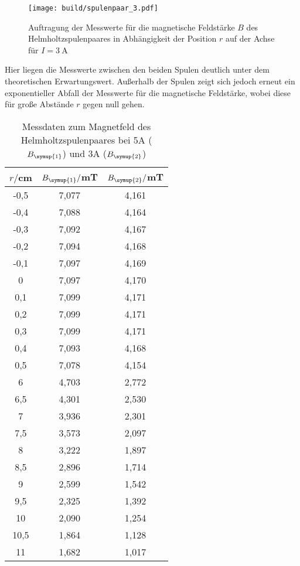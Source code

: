 \begin{figure}
  \centering
  \texttt{[image: build/spulenpaar\_3.pdf]}
  \caption{Auftragung der Messwerte für die magnetische Feldstärke $B$ des Helmholtzspulenpaares
  in Abhängigkeit der Position $r$ auf der Achse für $I=\SI{3}{\ampere}$}
  \label{fig:spulenpaar_3}
\end{figure}

Hier liegen die Messwerte zwischen den beiden Spulen deutlich unter dem
theoretischen Erwartungswert. Außerhalb der Spulen zeigt sich jedoch erneut ein
exponentieller Abfall der Messwerte für die magnetische Feldstärke, wobei diese für
große Abstände $r$ gegen null gehen.


\begin{table}
  \centering
  \caption{Messdaten zum Magnetfeld des Helmholtzspulenpaares bei 5A ($B_{\symup{1}}$)
  und 3A ($B_{\symup{2}}$)}
  \label{tab:helmholtz}
  \begin{tabular}{c c c}
    \toprule
    $r/$cm & $B_{\symup{1}}/$mT & $B_{\symup{2}}/$mT\\
    \midrule
    -0,5	&  7,077 & 4,161\\
    -0,4	&  7,088 & 4,164\\
    -0,3	&  7,092 & 4,167\\
    -0,2	&  7,094 & 4,168\\
    -0,1	&  7,097 & 4,169\\
    0	    &  7,097 & 4,170\\
    0,1	  &  7,099 & 4,171\\
    0,2	  &  7,099 & 4,171\\
    0,3	  &  7,099 & 4,171\\
    0,4	  &  7,093 & 4,168\\
    0,5	  &  7,078 & 4,154\\
    6	    &  4,703 & 2,772\\
    6,5	  &  4,301 & 2,530\\
    7	    &  3,936 & 2,301\\
    7,5	  &  3,573 & 2,097\\
    8	    &  3,222 & 1,897\\
    8,5	  &  2,896 & 1,714\\
    9	    &  2,599 & 1,542\\
    9,5 	&  2,325 & 1,392\\
    10	  &  2,090 & 1,254\\
    10,5	&  1,864 & 1,128\\
    11	  &  1,682 & 1,017\\

\end{tabular}
\end{table}
